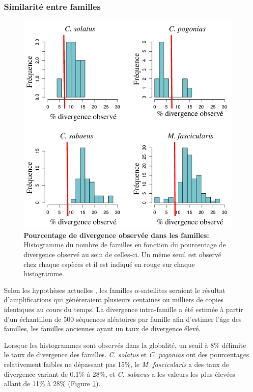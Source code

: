 \documentclass[12pt,a4paper]{article}
\begin{document}
			\subsubsection{Similarité entre familles}
\begin{figure}	
	\center
	\includegraphics[scale=0.4]{img/hist_similarity.png}
	\caption{\textbf{Pourcentage de divergence observée dans les familles:} Histogramme du nombre de familles en fonction du pourcentage de divergence observé au sein de celles-ci. Un même seuil est observé chez chaque espèces et il est indiqué en rouge sur chaque histogramme. 
	\label{fig:divergence}
		} 
\end{figure}

	Selon les hypothèses actuelles \cite{Rudd2006}, les familles $\alpha$-satellites seraient le résultat d'amplifications qui généreraient plusieurs centaines ou milliers de copies identiques au cours du temps. La divergence intra-famille a été estimée à partir d'un échantillon de 500 séquences aléatoires par famille afin d'estimer l'âge des familles, les familles anciennes ayant un taux de divergence élevé. 
	
	Lorsque les histogrammes sont observés dans la globalité, un seuil à 8\% délimite le taux de divergence des familles. \textit{C. solatus} et \textit{C. pogonias} ont des pourcentages relativement faibles ne dépassant pas 15\%, le \textit{M. fascicularis} a des taux de divergence variant de 0.1\% à 28\%, et \textit{C. sabaeus} a les valeurs les plus élevées allant de 11\% à 28\% (Figure \ref{fig:divergence}).
	
\end{document}
